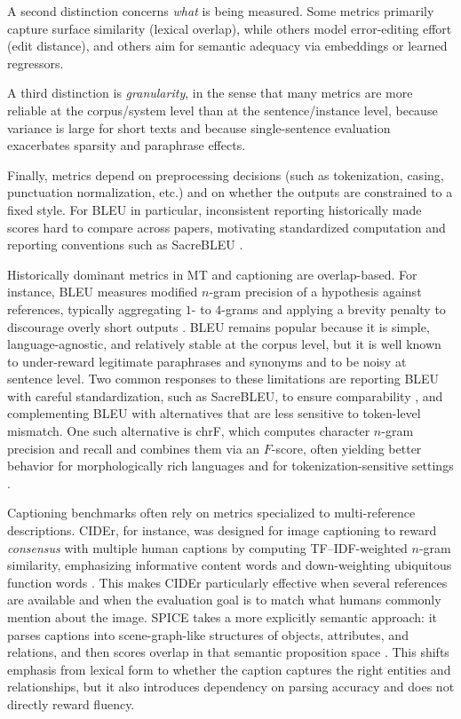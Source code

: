 A second distinction concerns \emph{what} is being measured. Some metrics primarily capture surface similarity (lexical overlap), while others model error-editing effort (edit distance), and others aim for semantic adequacy via embeddings or learned regressors. 

A third distinction is \emph{granularity}, in the sense that many metrics are more reliable at the corpus/system level than at the sentence/instance level, because variance is large for short texts and because single-sentence evaluation exacerbates sparsity and paraphrase effects. 

Finally, metrics depend on preprocessing decisions (such as tokenization, casing, punctuation normalization, etc.) and on whether the outputs are constrained to a fixed style. For BLEU in particular, inconsistent reporting historically made scores hard to compare across papers, motivating standardized computation and reporting conventions such as SacreBLEU \cite{post-2018-sacrebleu}.

Historically dominant metrics in MT and captioning are overlap-based. For instance, BLEU measures modified $n$-gram precision of a hypothesis against references, typically aggregating $1$- to $4$-grams and applying a brevity penalty to discourage overly short outputs \cite{papineni-etal-2002-bleu}. BLEU remains popular because it is simple, language-agnostic, and relatively stable at the corpus level, but it is well known to under-reward legitimate paraphrases and synonyms and to be noisy at sentence level. Two common responses to these limitations are reporting BLEU with careful standardization, such as SacreBLEU, to ensure comparability \cite{post-2018-sacrebleu}, and complementing BLEU with alternatives that are less sensitive to token-level mismatch. One such alternative is chrF, which computes character $n$-gram precision and recall and combines them via an $F$-score, often yielding better behavior for morphologically rich languages and for tokenization-sensitive settings \cite{popovic-2015-chrf}.


Captioning benchmarks often rely on metrics specialized to multi-reference descriptions. CIDEr, for instance, was designed for image captioning to reward \emph{consensus} with multiple human captions by computing TF--IDF-weighted $n$-gram similarity, emphasizing informative content words and down-weighting ubiquitous function words \cite{vedantam-etal-2015-cider}. This makes CIDEr particularly effective when several references are available and when the evaluation goal is to match what humans commonly mention about the image. SPICE takes a more explicitly semantic approach: it parses captions into scene-graph-like structures of objects, attributes, and relations, and then scores overlap in that semantic proposition space \cite{anderson-etal-2016-spice}. This shifts emphasis from lexical form to whether the caption captures the right entities and relationships, but it also introduces dependency on parsing accuracy and does not directly reward fluency.


